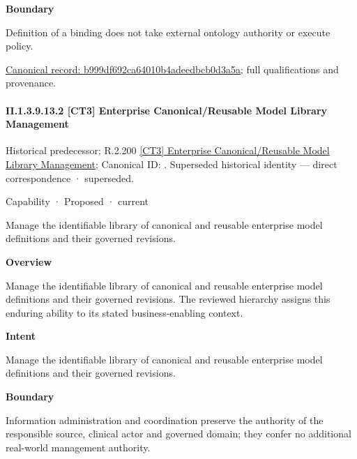 \textbf{Boundary}



Definition of a binding does not take external ontology authority or execute policy.


{\footnotesize \href{../../../../../../../continuum/strategy/capability/feature/b999df692ca64010b4adeedbcb0d3a5a.md}{Canonical record: b999df692ca64010b4adeedbcb0d3a5a}; full qualifications and provenance.}\par
\paragraph*{II.1.3.9.13.2 [CT3] Enterprise Canonical/Reusable Model Library Management}
\label{navigation:II.1.3.9.13.2}

{\small Historical predecessor: R.2.200 \hyperref[element:f5eccd4f65df49bba98104e5abfa5e19]{[CT3] Enterprise Canonical/Reusable Model Library Management}; Canonical ID: \texttt{}. Superseded historical identity — direct correspondence · superseded.}\par
\label{element:76943b4b68644c4dac1368fce8bb20d9}
{\small Capability · Proposed · current}\par

Manage the identifiable library of canonical and reusable enterprise model definitions and their governed revisions.



\textbf{Overview}



Manage the identifiable library of canonical and reusable enterprise model definitions and their governed revisions. The reviewed hierarchy assigns this enduring ability to its stated business-enabling context.



\textbf{Intent}



Manage the identifiable library of canonical and reusable enterprise model definitions and their governed revisions.



\textbf{Boundary}



Information administration and coordination preserve the authority of the responsible source, clinical actor and governed domain; they confer no additional real-world management authority.


